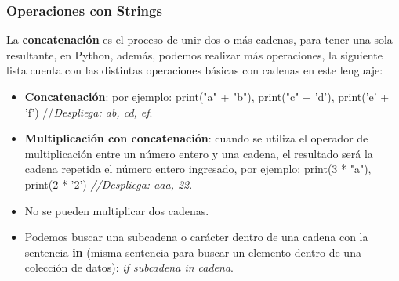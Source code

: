 \subsubsection{Operaciones con Strings}
\hspace{0.55cm}La \textbf{concatenación} es el proceso de unir dos o más cadenas, para tener una sola resultante, en Python, además, podemos realizar más operaciones, la siguiente lista cuenta con las distintas operaciones básicas con cadenas en este lenguaje:
\begin{itemize}
	\item \textbf{Concatenación}: por ejemplo: print("a" + "b"), print("c" + 'd'), print('e' + 'f') //\textit{Despliega: ab, cd, ef}.
	\item \textbf{Multiplicación con concatenación}: cuando se utiliza el operador de multiplicación entre un número entero y una cadena, el resultado será la cadena repetida el número entero ingresado, por ejemplo: print(3 * "a"), print(2 * '2') \textit{//Despliega: aaa, 22}.
	\item No se pueden multiplicar dos cadenas.
	\item Podemos buscar una subcadena o carácter dentro de una cadena con la sentencia \textbf{in} (misma sentencia para buscar un elemento dentro de una colección de datos): \textit{if subcadena in cadena}.
\end{itemize}


